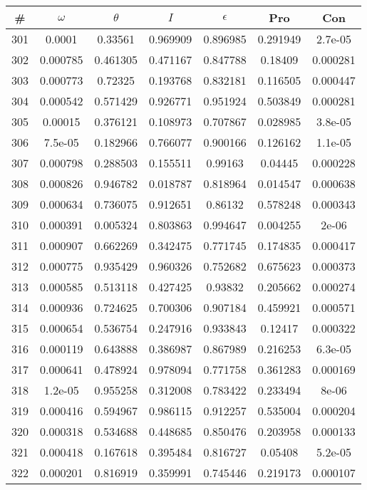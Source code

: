 \newpage
\begin{table}
\begin{tabular}{c|c|c|c|c|c|c}
\# & $\omega$ & $\theta$ & $I$ & $\epsilon$ & Pro & Con\\
\hline
301 & 0.0001 & 0.33561 & 0.969909 & 0.896985 & 0.291949 & 2.7e-05\\
302 & 0.000785 & 0.461305 & 0.471167 & 0.847788 & 0.18409 & 0.000281\\
303 & 0.000773 & 0.72325 & 0.193768 & 0.832181 & 0.116505 & 0.000447\\
304 & 0.000542 & 0.571429 & 0.926771 & 0.951924 & 0.503849 & 0.000281\\
305 & 0.00015 & 0.376121 & 0.108973 & 0.707867 & 0.028985 & 3.8e-05\\
306 & 7.5e-05 & 0.182966 & 0.766077 & 0.900166 & 0.126162 & 1.1e-05\\
307 & 0.000798 & 0.288503 & 0.155511 & 0.99163 & 0.04445 & 0.000228\\
308 & 0.000826 & 0.946782 & 0.018787 & 0.818964 & 0.014547 & 0.000638\\
309 & 0.000634 & 0.736075 & 0.912651 & 0.86132 & 0.578248 & 0.000343\\
310 & 0.000391 & 0.005324 & 0.803863 & 0.994647 & 0.004255 & 2e-06\\
311 & 0.000907 & 0.662269 & 0.342475 & 0.771745 & 0.174835 & 0.000417\\
312 & 0.000775 & 0.935429 & 0.960326 & 0.752682 & 0.675623 & 0.000373\\
313 & 0.000585 & 0.513118 & 0.427425 & 0.93832 & 0.205662 & 0.000274\\
314 & 0.000936 & 0.724625 & 0.700306 & 0.907184 & 0.459921 & 0.000571\\
315 & 0.000654 & 0.536754 & 0.247916 & 0.933843 & 0.12417 & 0.000322\\
316 & 0.000119 & 0.643888 & 0.386987 & 0.867989 & 0.216253 & 6.3e-05\\
317 & 0.000641 & 0.478924 & 0.978094 & 0.771758 & 0.361283 & 0.000169\\
318 & 1.2e-05 & 0.955258 & 0.312008 & 0.783422 & 0.233494 & 8e-06\\
319 & 0.000416 & 0.594967 & 0.986115 & 0.912257 & 0.535004 & 0.000204\\
320 & 0.000318 & 0.534688 & 0.448685 & 0.850476 & 0.203958 & 0.000133\\
321 & 0.000418 & 0.167618 & 0.395484 & 0.816727 & 0.05408 & 5.2e-05\\
322 & 0.000201 & 0.816919 & 0.359991 & 0.745446 & 0.219173 & 0.000107\\

\end{tabular}
\end{table}
